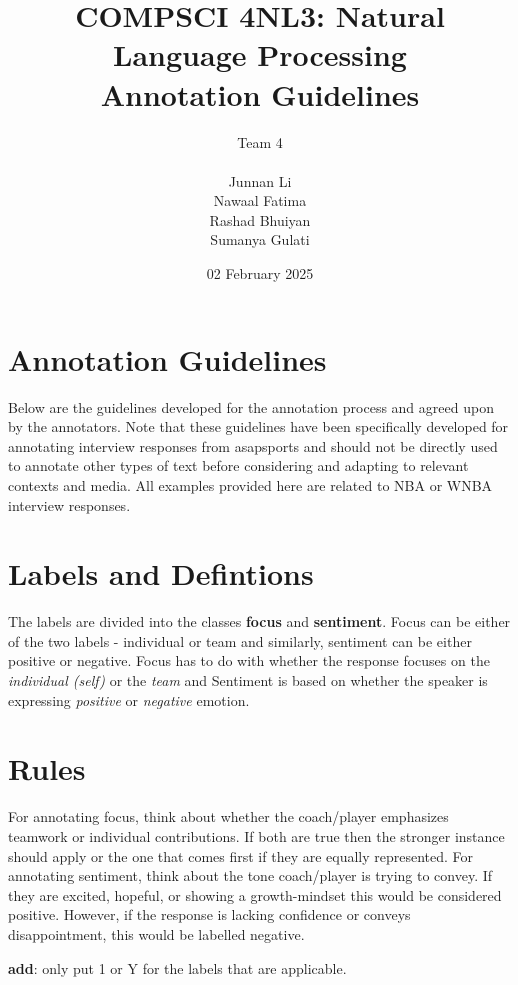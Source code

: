 \documentclass[titlepage]{article}
\title{COMPSCI 4NL3: Natural Language Processing\\
Annotation Guidelines}
\author{Team 4\\
\\ Junnan Li
\\ Nawaal Fatima
\\ Rashad Bhuiyan
\\ Sumanya Gulati}
\date{02 February 2025}
\begin{document}
\begin{titlepage}
  \maketitle
\end{titlepage}

\newpage

\section{Annotation Guidelines}
Below are the guidelines developed for the annotation process and agreed upon 
by the annotators. Note that these guidelines have been specifically developed for 
annotating interview responses from asapsports and should not be directly used to
annotate other types of text before considering and adapting to relevant contexts and media. 
All examples provided here are related to NBA or WNBA interview responses.

\section{Labels and Defintions}
The labels are divided into the classes \textbf{focus} and \textbf{sentiment}. Focus can be either of 
the two labels - individual or team and similarly, sentiment can be either positive or negative. 
Focus has to do with whether the response focuses on the \emph{individual (self)} or the \emph{team} and 
Sentiment is based on whether the speaker is expressing \emph{positive} or \emph{negative} emotion.

\section{Rules}
For annotating focus, think about whether the coach/player emphasizes teamwork or individual contributions.
If both are true then the stronger instance should apply or the one that comes first if they are equally 
represented. For annotating sentiment, think about the tone coach/player is trying to convey. If they are 
excited, hopeful, or showing a growth-mindset this would be considered positive. However, if the response 
is lacking confidence or conveys disappointment, this would be labelled negative.

\textbf{add}: only put 1 or Y for the labels that are applicable.
\end{document}
